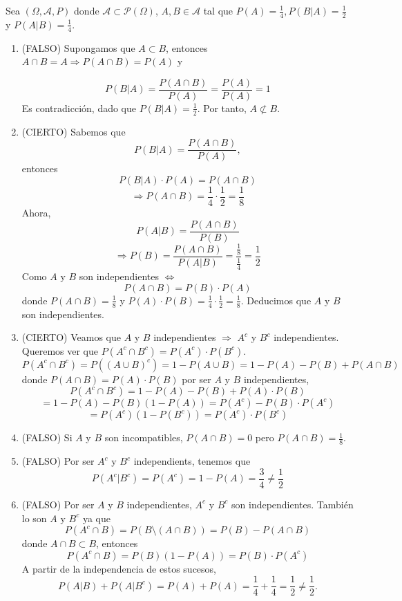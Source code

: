\begin{sol}
  Sea $(\Omega, \mathcal{A}, P )$ donde $\mathcal{A} \subset \mathcal{P}(\Omega)$, $A, B \in \mathcal{A}$ tal que $P(A) = \frac{1}{4}, P(B | A) = \frac{1}{2}$ y $P(A | B) = \frac{1}{4}$.
  \begin{enumerate}[label=(\roman*)]
    \item (FALSO) Supongamos que $A \subset B$, entonces $A \cap B = A \Rightarrow P(A \cap B) = P(A)$ y

      \[
        P(B | A) = \frac{P(A \cap B)}{P(A)} = \frac{P(A)}{P(A)} = 1
      \]
      Es contradicción, dado que $P(B | A) = \frac{1}{2}$. Por tanto, $A \not \subset B$.

    \item (CIERTO) Sabemos que
      \[ 
        P(B | A) = \frac{P(A \cap B)}{ P(A)},
      \] 
      entonces
      \[ 
        P(B | A) \cdot P(A) = P(A \cap B) 
      \] 
      \[ 
        \Rightarrow P(A \cap B) = \frac{1}{4} \cdot \frac{1}{2} = \frac{1}{8} 
      \]  
      Ahora,
      \[ 
        P(A | B) = \frac{P(A \cap B)}{P(B)}
      \] 
      \[ 
        \Rightarrow P(B) = \frac{P(A \cap B)}{P(A | B)} = \frac{\frac{1}{8}}{\frac{1}{4}} = \frac{1}{2} 
      \] 
      Como $A$ y $B$ son independientes $\Leftrightarrow$
      \[ 
        P(A \cap B) = P(B) \cdot P(A) 
      \] 
      donde $P(A \cap B) = \frac{1}{8}$ y $P(A) \cdot P(B) = \frac{1}{4} \cdot \frac{1}{2} = \frac{1}{8}$. Deducimos que $A$ y $B$ son independientes.

    \item (CIERTO) Veamos que $A$ y $B$ independientes $\Rightarrow$ $A^{c}$ y $B^{c}$ independientes. Queremos ver que $P(A^{c} \cap B^{c}) = P(A^{c})\cdot P(B^{c})$.
      \[ 
        P(A^{c} \cap B^{c}) = P((A \cup B)^{c}) = 1 - P(A \cup B) = 1 - P(A) - P(B) + P(A \cap B)
      \] 
      donde $P(A \cap B) = P(A) \cdot P(B)$ por ser $A$ y $ B$ independientes,
      \[ 
        P(A^{c} \cap B^{c}) = 1 - P(A) - P(B) + P(A)\cdot P(B)
      \] 
      \[ 
        = 1 - P(A) - P(B)(1 - P(A)) = P(A^{c}) - P(B) \cdot P(A^{c}) 
      \]
      \[ 
        = P(A^{c})(1 - P(B^{c})) = P(A^{c}) \cdot P(B^{c}) 
      \] 

    \item (FALSO) Si $A$ y $B$ son incompatibles, $P(A \cap B) = 0$ pero $P(A \cap B) = \frac{1}{8}$.
    \item (FALSO) Por ser $A^{c}$ y $B^{c}$ independients, tenemos que
      \[
        P(A^{c} | B^{c}) = P(A^{c}) = 1 - P(A) = \frac{3}{4} \neq \frac{1}{2}
      \] 

    \item (FALSO) Por ser $A$ y $B$ independientes, $A^{c}$ y $B^{c}$ son independientes. También lo son $ A$ y $B^{c}$ ya que
      \[ 
        P(A^{c} \cap B) = P(B \setminus (A \cap B)) = P(B) - P(A \cap B)
      \] 
      donde $A \cap B \subset B$, entonces
      \[ 
        P(A^{c} \cap B) = P(B)(1 - P(A)) = P(B) \cdot P(A^{c}) 
      \] 
      A partir de la independencia de estos sucesos,
      \[ 
        P(A | B) + P(A | B^{c}) = P(A) + P(A) = \frac{1}{4} + \frac{1}{4} = \frac{1}{2} \neq \frac{1}{2}.
      \] 
  \end{enumerate}
\end{sol}

